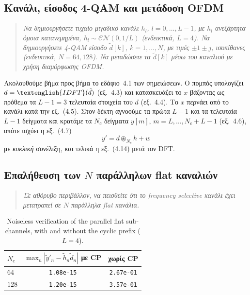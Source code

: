 \documentclass[11pt,a4paper]{article}
\newenvironment{zit}%
  {\begin{quote}\itshape}%
  {\end{quote}\noindent}
\newcommand{\en}[1]{\textenglish{#1}}
\newcommand{\CP}{\en{CP}}
\begin{document}
\subsection{Κανάλι, είσοδος \en{4-QAM} και μετάδοση \en{OFDM}}

\begin{zit}
Να δημιουργήσετε τυχαίο μιγαδικό κανάλι $h_l$, $l=0,\dots,L-1$, με $h_l$ ανεξάρτητα όμοια
κατανεμημένα, $h_l \sim \mathcal{CN}(0,1/L)$ (ενδεικτικά, $L=4$). Να δημιουργήσετε
\en{4-QAM} είσοδο $\tilde d[k]$, $k=1,\dots,N$, με τιμές $\pm 1 \pm j$, ισοπίθανες
(ενδεικτικά, $N=64,128$). Να μεταδώσετε τα $\tilde d[k]$ μέσω του καναλιού με χρήση
διαμόρφωσης \en{OFDM}.
\end{zit}

Ακολουθούμε βήμα προς βήμα το εδάφιο~4.1 των σημειώσεων. Ο πομπός υπολογίζει
$d = \en{IDFT}(\tilde d)$ (εξ.~4.3) και κατασκευάζει το $x$ βάζοντας ως πρόθεμα τα $L-1=3$
τελευταία στοιχεία του $d$ (εξ.~4.4). Το $x$ περνάει από το κανάλι κατά την εξ.~(4.5). Στον
δέκτη αγνοούμε τα πρώτα $L-1$ και τα τελευταία $L-1$ δείγματα και κρατάμε τα $N_c$ δείγματα
$y[m]$, $m = L,\dots,N_c+L-1$ (εξ.~4.6), οπότε ισχύει η εξ.~(4.7)
\[
  y' = d \circledast_{N_c} h + w
\]
με \emph{κυκλική} συνέλιξη, και τελικά η εξ.~(4.14) μετά τον \en{DFT}.

\subsection{Επαλήθευση των $N$ παράλληλων \en{flat} καναλιών}

\begin{zit}
Σε αθόρυβο περιβάλλον, να πεισθείτε ότι το \en{frequency selective} κανάλι έχει μετατραπεί σε
$N$ παράλληλα \en{flat} κανάλια.
\end{zit}

\begin{table}[H]
  \centering\small
  \begin{tabular}{lcc}
    \toprule
    $N_c$ & $\max_n\left|\tilde y'_n-\tilde h_n \tilde d_n\right|$ \textbf{με} \CP{}
        & \textbf{χωρίς} \CP{} \\
    \midrule
    $64$  & \texttt{1.08e-15} & \texttt{2.67e-01} \\
    $128$ & \texttt{1.20e-15} & \texttt{3.57e-01} \\
    \bottomrule
  \end{tabular}
  \caption{\en{Noiseless verification of the parallel flat sub-channels, with and without
  the cyclic prefix ($L=4$).}}
\end{table}
\end{document}
